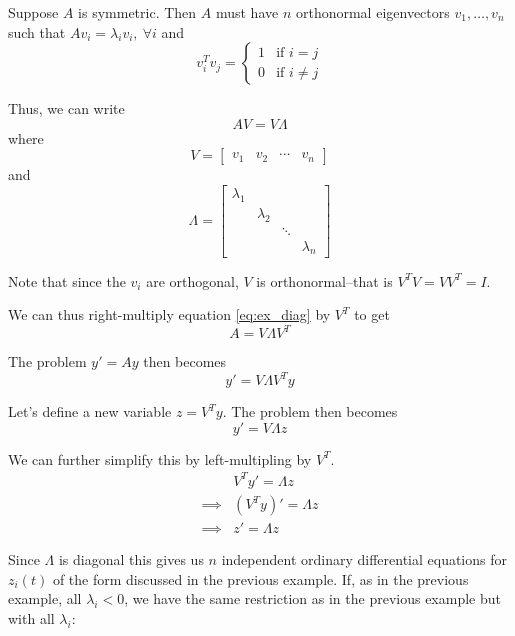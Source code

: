 \documentclass[12pt,letterpaper]{article}
\begin{document}
Suppose $A$ is symmetric. Then $A$ must have $n$ orthonormal eigenvectors $v_1, \dots, v_n$ such that $Av_i = \lambda_i v_i,\ \forall i$ and
\begin{equation}
v_i^T v_j = \begin{cases}
	1 & \text{if } i = j \\
	0 & \text{if } i \neq j
\end{cases}
\end{equation}

Thus, we can write
\begin{equation} \label{eq:ex_diag}
	A V = V \Lambda
\end{equation}
where
\begin{equation}
V = \begin{bmatrix}
	v_1 & v_2 & \cdots & v_n
\end{bmatrix}
\end{equation}
and
\begin{equation}
\Lambda = \begin{bmatrix}
	\lambda_1 \\
	& \lambda_2 \\
	& & \ddots \\
	& & & \lambda_n
\end{bmatrix}
\end{equation}

Note that since the $v_i$ are orthogonal, $V$ is orthonormal--that is $V^T V = VV^T = I$.

We can thus right-multiply equation \ref{eq:ex_diag} by $V^T$ to get
\begin{equation}
	A = V \Lambda V^T
\end{equation}

The problem $y' = Ay$ then becomes
\begin{equation}
	y' = V \Lambda V^T y
\end{equation}

Let's define a new variable $z = V^T y$. The problem then becomes
\begin{equation}
	y' = V \Lambda z
\end{equation}

We can further simplify this by left-multipling by $V^T$.
\begin{align}
	& V^T y' = \Lambda z \\
	\implies & (V^T y)' = \Lambda z \\
	\implies & z' = \Lambda z
\end{align}

Since $\Lambda$ is diagonal this gives us $n$ independent ordinary differential equations for $z_i(t)$ of the form discussed in the previous example. If, as in the previous example, all $\lambda_i < 0$, we have the same restriction as in the previous example but with all $\lambda_i$:
\end{document}
